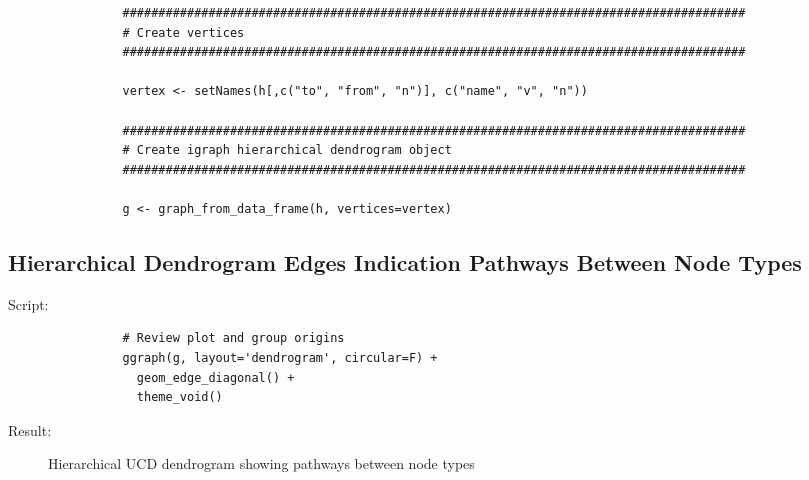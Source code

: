 \documentclass[10pt, letterpaper]{article}
\begin{document}
\begin{spacing}{1.0}
\begin{verbatim}
                #######################################################################################
                # Create vertices
                #######################################################################################
                
                vertex <- setNames(h[,c("to", "from", "n")], c("name", "v", "n"))
                
                #######################################################################################
                # Create igraph hierarchical dendrogram object
                #######################################################################################
                
                g <- graph_from_data_frame(h, vertices=vertex)
\end{verbatim}
\normalsize

\subsection{Hierarchical Dendrogram Edges Indication Pathways Between Node Types}

Script:
\small
\begin{verbatim}
                # Review plot and group origins
                ggraph(g, layout='dendrogram', circular=F) + 
                  geom_edge_diagonal() +
                  theme_void()
\end{verbatim}
\normalsize

Result:

\begin{figure}[H]
    \centering
    \caption{Hierarchical UCD dendrogram showing pathways between node types}
    \label{fg:dend1}
\end{figure}


\end{spacing}
\end{document}
